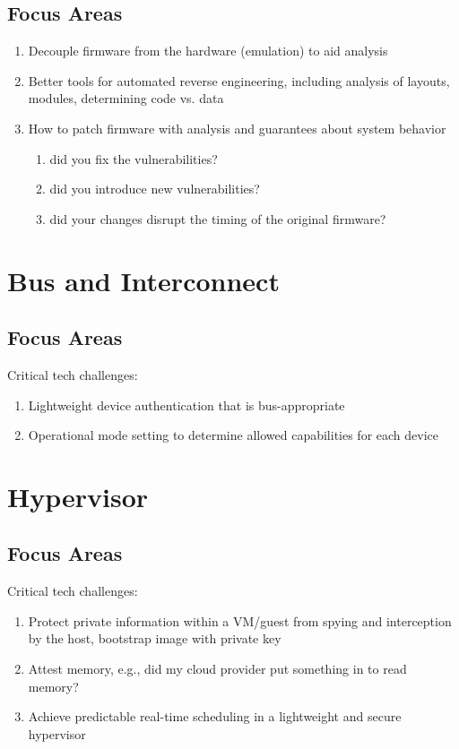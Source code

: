 \documentclass[11pt]{article}
\begin{document}
\subsection{Focus Areas}

\begin{enumerate}
	\item Decouple firmware from the hardware (emulation) to aid analysis
	\item Better tools for automated reverse engineering, including
	analysis of layouts, modules, determining code vs. data
	\item How to patch firmware with analysis and guarantees about
	system behavior
	\begin{enumerate}
		\item did you fix the vulnerabilities?
		\item did you introduce new vulnerabilities?
		\item did your changes disrupt the timing of the original firmware?
	\end{enumerate}
\end{enumerate}

\section{Bus and Interconnect}

\subsection{Focus Areas}

Critical tech challenges:
\begin{enumerate}
	\item Lightweight device authentication that is bus-appropriate
	\item Operational mode setting to determine allowed capabilities
	for each device
\end{enumerate}


\section{Hypervisor}

\subsection{Focus Areas}

Critical tech challenges:
\begin{enumerate}
	\item Protect private information within a VM/guest from spying
	and interception by the host, bootstrap image with private key
	\item Attest memory, e.g., did my cloud provider put something in
	to read memory?
	\item Achieve predictable real-time scheduling in a lightweight
	and secure hypervisor
\end{enumerate}
\end{document}
